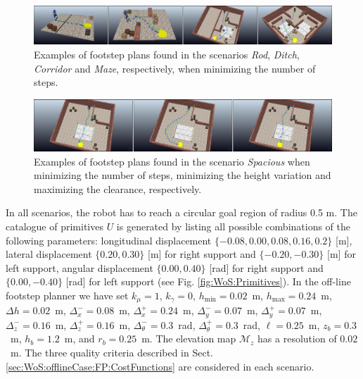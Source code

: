 \begin{figure}
\centering
\includegraphics[width=\textwidth]{figures/ExampleResults.png}
\caption{Examples of footstep plans found in the scenarios \textit{Rod}, \textit{Ditch}, \textit{Corridor} and \textit{Maze}, respectively, when minimizing the number of steps.}
\label{fig:WoS:ExampleResults}
\end{figure}
\begin{figure}
\centering
\includegraphics[width=\textwidth]{figures/ExampleResultsCompare.png}
\caption{Examples of footstep plans found in the scenario \textit{Spacious} when minimizing the number of steps, minimizing the height variation and maximizing the clearance, respectively.}
\label{fig:WoS:ExampleResultsCompare}
\end{figure}

In all scenarios, the robot has to reach a circular goal region of radius 0.5 m.
The catalogue of primitives $U$ is generated by listing all possible combinations of the following parameters: longitudinal displacement $\{-0.08,0.00,0.08,0.16,0.2\}$ [m], lateral displacement $\{0.20,0.30\}$ [m] for right support and $\{-0.20,-0.30\}$ [m] for left support, angular displacement $\{0.00,0.40\}$ [rad] for right support and $\{0.00,-0.40\}$ [rad] for left support (see Fig. \ref{fig:WoS:Primitives}).
In the off-line footstep planner we have set $k_{\mu} = 1$, $k_{\gamma} = 0$, $h_{\min} = 0.02$~m, $h_{\max} = 0.24$~m, $\Delta h = 0.02$~m, $\Delta_x^- = 0.08$~m, $\Delta_x^+ = 0.24$~m, $\Delta_y^-=0.07$~m, $\Delta_y^+=0.07$~m, $\Delta_z^-=0.16$~m, $\Delta_z^+=0.16$~m, $\Delta_\theta^-=0.3$~rad, $\Delta_\theta^+=0.3$~rad, $\ell = 0.25$~m, $z_b=0.3$~m, $h_b=1.2$~m, and $r_b=0.25$~m.
The elevation map $\mathcal{M}_z$ has a resolution of $0.02$~m.
The three quality criteria described in Sect. \ref{sec:WoS:offlineCase:FP:CostFunctions} are considered in each scenario.


